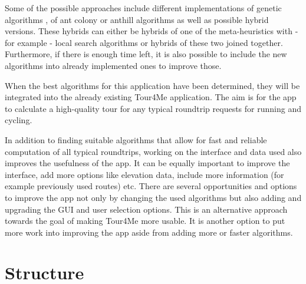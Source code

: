 Some of the possible approaches include different implementations of genetic algorithms \cite{gendreau_handbook_2010}, of ant colony or anthill algorithms \cite{babaoglu_anthill_2002, gendreau_handbook_2010, wang_application_2014} as well as possible hybrid versions.
These hybrids can either be hybrids of one of the meta-heuristics with - for example - local search algorithms \cite{gendreau_handbook_2010, wang_application_2014} or hybrids of these two joined together.
Furthermore, if there is enough time left, it is also possible to include the new algorithms into already implemented ones to improve those.

When the best algorithms for this application have been determined, they will be integrated into the already existing Tour4Me application. The aim is for the app to calculate a high-quality tour for any typical roundtrip requests for running and cycling.

In addition to finding suitable algorithms that allow for fast and reliable computation of all typical roundtrips, working on the interface and data used also improves the usefulness of the app.
It can be equally important to improve the interface, add more options like elevation data, include more information (for example previously used routes) etc. 
There are several opportunities and options to improve the app not only by changing the used algorithms but also adding and upgrading the GUI and user selection options.
This is an alternative approach towards the goal of making Tour4Me more usable.
It is another option to put more work into improving the app aside from adding more or faster algorithms.



\section{Structure}
\label{sec:structure}